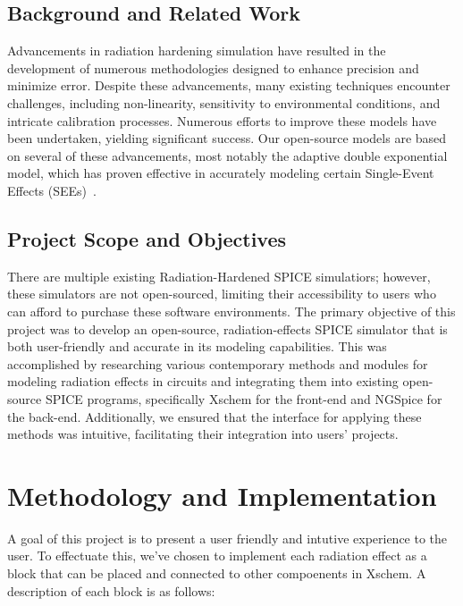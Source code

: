 \documentclass[conference]{IEEEtran}
\begin{document}
    \subsection{Background and Related Work}\label{subsec:background-and-related-work}
    Advancements in radiation hardening simulation have resulted in the development of numerous methodologies designed to enhance precision and minimize error.
    Despite these advancements, many existing techniques encounter challenges, including non-linearity, sensitivity to environmental conditions, and intricate calibration processes.
    Numerous efforts to improve these models have been undertaken, yielding significant success.
    Our open-source models are based on several of these advancements, most notably the adaptive double exponential model, which has proven effective in accurately modeling certain Single-Event Effects (SEEs)~\cite{}.

    \subsection{Project Scope and Objectives}\label{subsec:project-scope-and-objectives}
    There are multiple existing Radiation-Hardened SPICE simulatiors; however, these simulators are not open-sourced, limiting their accessibility to users who can afford to purchase these software environments.
    The primary objective of this project was to develop an open-source, radiation-effects SPICE simulator that is both user-friendly and accurate in its modeling capabilities.
    This was accomplished by researching various contemporary methods and modules for modeling radiation effects in circuits and integrating them into existing open-source SPICE programs, specifically Xschem for the front-end and NGSpice for the back-end.
    Additionally, we ensured that the interface for applying these methods was intuitive, facilitating their integration into users' projects.


    \section{Methodology and Implementation}\label{sec:methodology-and-implementation}
	A goal of this project is to present a user friendly and intutive experience to the user. To effectuate this, we've chosen to implement each radiation effect as a block that can be placed and connected to other compoenents in Xschem. A description of each block is as follows:

    \vspace{1em}
\end{document}
